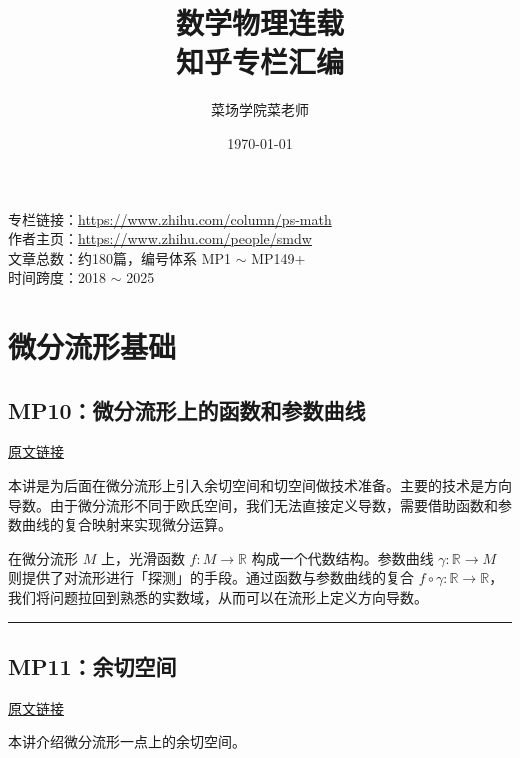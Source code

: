 \documentclass[10pt, openany]{book}
\begin{document}
\frontmatter
\title{\textbf{数学物理连载}\\\large 知乎专栏汇编}
\author{菜场学院菜老师}
\date{\today}
\maketitle

\begin{center}
\large
专栏链接：\url{https://www.zhihu.com/column/ps-math}\\[6pt]
作者主页：\url{https://www.zhihu.com/people/smdw}\\[6pt]
文章总数：约180篇，编号体系 MP1 $\sim$ MP149+\\[6pt]
时间跨度：2018 $\sim$ 2025
\end{center}

\tableofcontents

\mainmatter

\chapter{微分流形基础}

\section{MP10：微分流形上的函数和参数曲线}
\label{sec:mp10}

\href{https://zhuanlan.zhihu.com/p/44203444}{原文链接}

本讲是为后面在微分流形上引入余切空间和切空间做技术准备。主要的技术是方向导数。由于微分流形不同于欧氏空间，我们无法直接定义导数，需要借助函数和参数曲线的复合映射来实现微分运算。

在微分流形 $M$ 上，光滑函数 $f: M \to \mathbb{R}$ 构成一个代数结构。参数曲线 $\gamma: \mathbb{R} \to M$ 则提供了对流形进行「探测」的手段。通过函数与参数曲线的复合 $f \circ \gamma: \mathbb{R} \to \mathbb{R}$，我们将问题拉回到熟悉的实数域，从而可以在流形上定义方向导数。

\medskip
\noindent\rule{\textwidth}{0.4pt}

\section{MP11：余切空间}
\label{sec:mp11}

\href{https://zhuanlan.zhihu.com/p/44190499}{原文链接}

本讲介绍微分流形一点上的余切空间。
\end{document}
